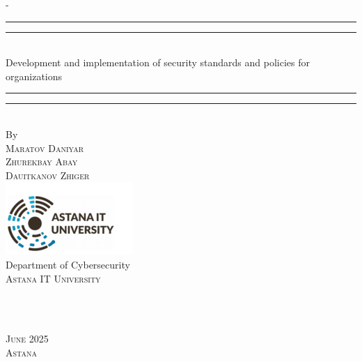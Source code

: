 %
%
\begin{titlingpage}
\begin{SingleSpace}
\calccentering{\unitlength} 
\begin{adjustwidth*}{\unitlength}{-\unitlength}
\vspace*{13mm}
\begin{center}
\rule[0.5ex]{\linewidth}{2pt}\vspace*{-\baselineskip}\vspace*{3.2pt}
\rule[0.5ex]{\linewidth}{1pt}\\[\baselineskip]
{
\linespread{2.0} \selectfont
%
{\HUGE Development and implementation of security standards and policies for organizations }\\[4mm]
}

%
\rule[0.5ex]{\linewidth}{1pt}\vspace*{-\baselineskip}\vspace{3.2pt}
\rule[0.5ex]{\linewidth}{2pt}\\
\vspace{6.5mm}
{\large By}\\
\vspace{6.5mm}
{\large\textsc{Maratov Daniyar}}\\
{\large\textsc{Zhurekbay Abay}}\\
{\large\textsc{Dauitkanov Zhiger}}\\
\vspace{11mm}
\includegraphics[scale=1.2]{logos/AITU.png}\\
\vspace{6mm}
{\large Department of Cybersecurity\\
\textsc{Astana IT University}}\\
\vspace{30mm}
\begin{minipage}{10cm}
 \\
\end{minipage}\\
\vspace{20mm}
{\large\textsc{June 2025}}\\
{\large\textsc{Astana}}
\vspace{12mm}
\end{center}
\end{adjustwidth*}
\end{SingleSpace}
\end{titlingpage}